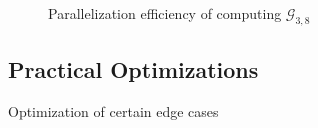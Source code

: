 \documentclass[
  paper=a4,
  DIV=14,
  fontsize=12pt,
  titlepage,
  bibliography=totoc,
  listof=totoc,
  pagesize=pdftex
]{scrartcl}
\numberwithin{figure}{section}
\numberwithin{equation}{section}
\numberwithin{table}{section}
\theoremstyle{definition}
\numberwithin{definition}{section}
\begin{document}
\begin{figure}[htbp]
  \begin{center}
    
  \end{center}
  \caption{Parallelization efficiency of computing $\mathcal{G}_{3,8}$}
  \label{fig:g38efficiency}
\end{figure}

\subsection{Practical Optimizations}

Optimization of certain edge cases

\newpage
\listoffigures
\newpage
\printbibliography
\end{document}
